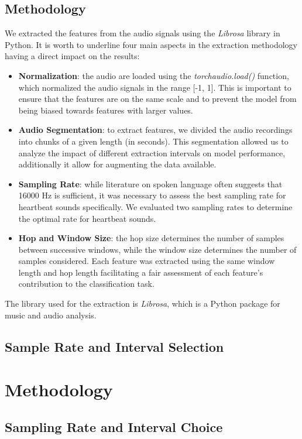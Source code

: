 \subsection{Methodology}
We extracted the features from the audio signals using the \textit{Librosa} library in Python. It is worth to underline four main aspects in the extraction
methodology having a direct impact on the results:
\begin{itemize}[leftmargin=*]
    \item \textbf{Normalization}: the audio are loaded using the \textit{torchaudio.load()} function, which normalized the audio signals in the range [-1, 1]. This is important to ensure that the features are on the same scale and to prevent the model from being biased towards features with larger values.
    \item \textbf{Audio Segmentation}: to extract features, we divided the audio recordings into chunks of a given length (in seconds). This segmentation allowed us to analyze the impact of different extraction intervals on model performance, additionally it allow for augmenting the data available. 
    \item \textbf{Sampling Rate}: while literature on spoken language often suggests that 16000 Hz is sufficient, it was necessary to assess the best sampling rate for heartbeat sounds specifically. We evaluated two sampling rates to determine the optimal rate for heartbeat sounds. 
    \item \textbf{Hop and Window Size}: the hop size determines the number of samples between successive windows, while the window size determines the number of samples considered. Each feature was extracted using the same window length and hop length facilitating a fair assessment of each feature's contribution to the classification task. 
\end{itemize}
The library used for the extraction is \textit{Librosa}, which is a Python package for music and audio analysis. 

\subsection{Sample Rate and Interval Selection}


\section{Methodology}

\subsection{Sampling Rate and Interval Choice}

